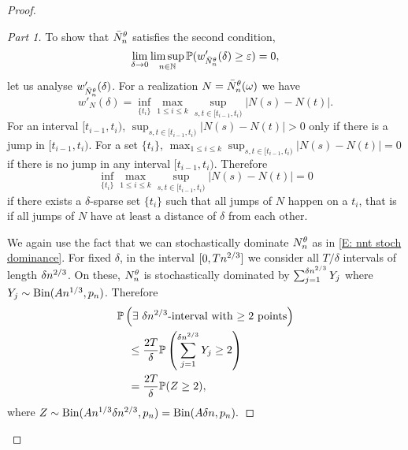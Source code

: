 \begin{proof}
\begin{proof}[Part 1]
\bigskip

To show that $\bar{N}_n^{\theta}$ satisfies the second condition,
\begin{equation} \label{E: tightness cond 2}
\lim_{\delta \rightarrow 0} \limsup_{n \in \mathbb{N}}\mathbb{P}(w'_{\bar{N}_n^{\theta}}(\delta) \geq \varepsilon ) = 0,
\end{equation}
let us analyse $w'_{\bar{N}_n^{\theta}}(\delta)$.
For a realization $N = \bar{N}_n^{\theta}(\omega)$ we have
\begin{equation*}
w'_{N}(\delta) = \inf_{\{t_i\}} \max_{1\leq i \leq k} \sup_{s,t \in [t_{i-1}, t_i)} |N(s) - N(t)|.
\end{equation*}
For an interval $[t_{i-1}, t_i)$, 
$\sup_{s,t \in [t_{i-1}, t_i)} |N(s) - N(t)| > 0$ only if there is a jump in $[t_{i-1}, t_i)$.
For a set $\{t_i\}$, $\max_{1\leq i \leq k} \sup_{s,t \in [t_{i-1}, t_i)} |N(s) - N(t)| = 0$ if there is no jump in any interval $[t_{i-1}, t_i)$.
Therefore
\begin{equation*}
\inf_{\{t_i\}} \max_{1\leq i \leq k} \sup_{s,t \in [t_{i-1}, t_i)} |N(s) - N(t)| = 0
\end{equation*}
if there exists a $\delta$-sparse set $\{t_i\}$ such that all jumps of $N$ happen on a $t_i$,
that is if all jumps of $N$ have at least a distance of $\delta$ from each other.

We again use the fact that we can stochastically dominate $N_n^{\theta}$ as in \eqref{E: nnt stoch dominance}.
For fixed $\delta$, in the interval $[0, Tn^{2 / 3}]$ we consider all $T/\delta$ intervals of length $\delta n^{2 / 3}$.
On these, $N_n^{\theta}$ is stochastically dominated by $\sum_{j = 1}^{\delta n^{2 / 3}} Y_j$ where $Y_j \sim \operatorname*{Bin}(An^{1 / 3}, p_n)$.
Therefore
\begin{equation*}
\begin{aligned}
&\mathbb{P}\left( \text{$\exists$ $\delta n^{2 / 3}$-interval with $\geq 2$ points} \right) \\
&\quad\leq \frac{2T}{\delta} \mathbb{P}\left( \sum_{j = 1}^{\delta n^{2 / 3}} Y_j \geq 2 \right) \\
&\quad=  \frac{2T}{\delta} \mathbb{P}( Z \geq 2 ),
\end{aligned}
\end{equation*}
where $Z \sim \operatorname*{Bin}(An^{1 / 3}\delta n^{2 / 3}, p_n) = \operatorname*{Bin}(A\delta n, p_n).$


\end{proof}
\end{proof}
